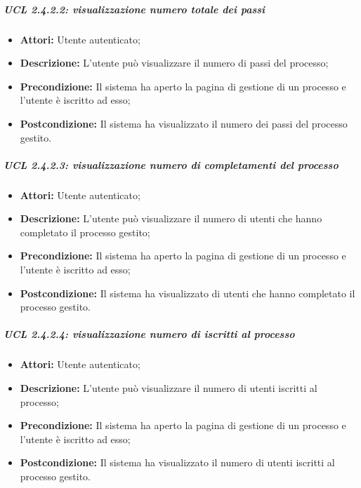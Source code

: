 \subparagraph{UCL 2.4.2.2: visualizzazione numero totale dei passi}
\begin{itemize}
\item \textbf{Attori:} Utente autenticato;
\item \textbf{Descrizione:} L'utente può visualizzare il numero di passi del processo;
\item \textbf{Precondizione:} Il sistema ha aperto la pagina di gestione di un processo e l'utente è iscritto ad esso;
\item \textbf{Postcondizione:} Il sistema ha visualizzato il numero dei passi del processo gestito.
\end{itemize}

\subparagraph{UCL 2.4.2.3: visualizzazione numero di completamenti del processo}
\begin{itemize}
\item \textbf{Attori:} Utente autenticato;
\item \textbf{Descrizione:} L'utente può visualizzare il numero di utenti che hanno completato il processo gestito;
\item \textbf{Precondizione:} Il sistema ha aperto la pagina di gestione di un processo e l'utente è iscritto ad esso;
\item \textbf{Postcondizione:} Il sistema ha visualizzato di utenti che hanno completato il processo gestito.
\end{itemize}

\subparagraph{UCL 2.4.2.4: visualizzazione numero di iscritti al processo}
\begin{itemize}
\item \textbf{Attori:} Utente autenticato;
\item \textbf{Descrizione:} L'utente può visualizzare il numero di utenti iscritti al processo;
\item \textbf{Precondizione:} Il sistema ha aperto la pagina di gestione di un processo e l'utente è iscritto ad esso;
\item \textbf{Postcondizione:} Il sistema ha visualizzato il numero di utenti iscritti al processo gestito.
\end{itemize}

